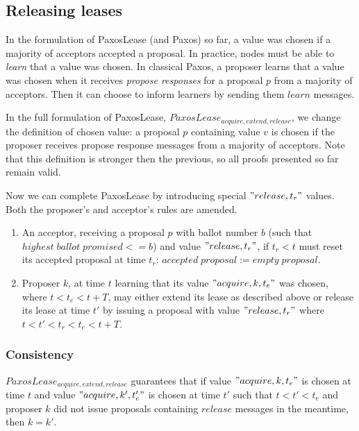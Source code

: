 \documentclass[12pt]{amsart}
\begin{document}
\subsection{ Releasing leases }

In the formulation of PaxosLease (and Paxos) so far, a value was chosen if a majority of acceptors accepted a proposal. In practice, nodes must be able to \emph{learn} that a value was chosen. In classical Paxos, a proposer learns that a value was chosen when it receives \emph{propose responses} for a proposal $p$ from a majority of acceptors. Then it can choose to inform learners by sending them $learn$ messages.

In the full formulation of PaxosLease, $PaxosLease_{acquire, extend, release}$, we change the definition of chosen value: a proposal $p$ containing value $v$ is chosen if the proposer receives propose response messages from a majority of acceptors.
Note that this definition is stronger then the previous, so all proofs presented so far remain valid.

Now we can complete PaxosLease by introducing special $"release, t_r"$ values. Both the proposer's and acceptor's rules are amended.

\begin{enumerate}

\item An acceptor, receiving a proposal $p$ with ballot number $b$ (such that $highest \; ballot \; promised <= b$) and value $"release, t_r"$, if $t_r < t$ must reset its accepted proposal at time $t_r$: $accepted \; proposal := empty \; proposal$.

\item Proposer $k$, at time $t$ learning that its value $"acquire, k, t_e"$ was chosen, where $t < t_e < t + T$, may either extend its lease as described above or release its lease at time $t'$ by issuing a proposal with value $"release, t_r"$ where $t < t' <  t_r < t_e < t + T$.

\end{enumerate}

\subsubsection{ Consistency } $PaxosLease_{acquire, extend, release}$ guarantees that if value $"acquire, k, t_e"$ is chosen at time $t$ and value $"acquire, k', t_e'"$ is chosen at time $t'$ such that $t < t' < t_e$ and proposer $k$ did not issue proposals containing $release$ messages in the meantime, then $k = k'$.
\end{document}
